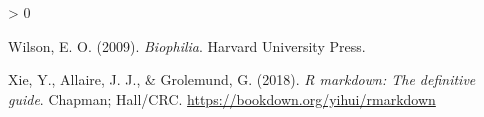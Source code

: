\documentclass[
  english,
  pub,floatsintext]{apa6}
\newlength{\cslhangindent}
\newenvironment{CSLReferences}[2] %
 {%
  \setlength{\parindent}{0pt}
  \ifodd #1 \everypar{\setlength{\hangindent}{\cslhangindent}}\ignorespaces\fi
  \ifnum #2 > 0
  \setlength{\parskip}{#2\baselineskip}
  \fi
 }%
 {}
\begin{document}
\begin{CSLReferences}{1}{0}
\leavevmode\hypertarget{ref-Wilson.2009}{}%
Wilson, E. O. (2009). \emph{Biophilia}. {Harvard University Press}.

\leavevmode\hypertarget{ref-R-rmarkdown}{}%
Xie, Y., Allaire, J. J., \& Grolemund, G. (2018). \emph{R markdown: The definitive guide}. Chapman; Hall/CRC. \url{https://bookdown.org/yihui/rmarkdown}

\end{CSLReferences}
\end{document}
